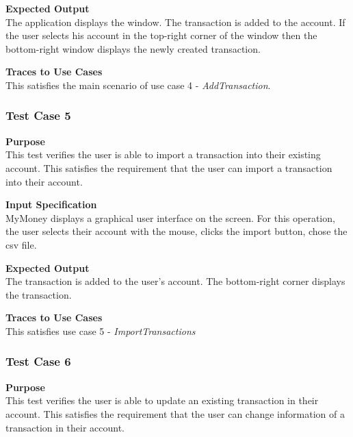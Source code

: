 \documentclass[12pt]{article}
\begin{document}
\noindent
{\bf Expected Output}\\
The application displays the window.    
The transaction is added to the account.
If the user selects his account in the top-right corner of the window then
the bottom-right window displays the newly created transaction.
                                                
\noindent
{\bf Traces to Use Cases}\\
This satisfies the main scenario of use case 4 - \textit{AddTransaction}.

\clearpage %
\subsubsection{Test Case 5} \label{TC-5}

\noindent
{\bf Purpose}\\
This test verifies the user is able to import a transaction into their existing account.
This satisfies the requirement that the user can import a transaction into their account.
                                                        

\noindent
{\bf Input Specification}\\
MyMoney displays a graphical user interface on the screen.
For this operation, the user selects their account with the mouse,
clicks the import button, chose the csv file.
                                                          

\noindent
{\bf Expected Output}\\
The transaction is added to the user's account.
The bottom-right corner displays the transaction.


\noindent
{\bf Traces to Use Cases}\\
This satisfies use case 5 - \textit{ImportTransactions}

\subsubsection{Test Case 6} \label{TC-6}
\noindent
{\bf Purpose}\\
This test verifies the user is able to update an existing transaction in their account.
This satisfies the requirement that the user can change information of a transaction in their account.
                                                        
\end{document}
